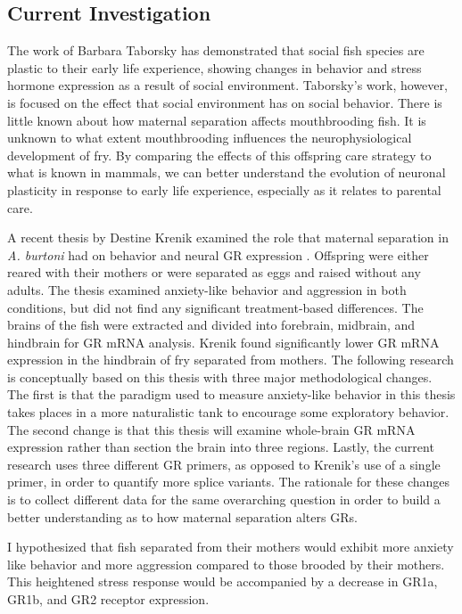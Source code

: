 \documentclass[12pt,twoside]{reedthesis}
\begin{document}
\subsection{Current Investigation}
 
The work of Barbara Taborsky has demonstrated that social fish species are
plastic to their early life experience, showing changes in behavior and stress
hormone expression as a result of social environment. Taborsky's work, however, is focused on the effect that social
environment has on social behavior. There is little known about how maternal
separation affects mouthbrooding fish. It is unknown to what extent
mouthbrooding influences the neurophysiological development of fry. By comparing
the effects of this offspring care strategy to what is known in mammals, we can
better understand the evolution of neuronal plasticity in response to early life
experience, especially as it relates to parental care. 

A recent thesis by Destine Krenik examined the role that maternal separation in
\textit{A. burtoni} had on behavior and neural GR
expression \citep{KrenikDestine2018Teom}. Offspring were either reared with their mothers or were separated as
eggs and raised without any adults. The thesis examined anxiety-like behavior and aggression in both
conditions, but did not find any significant treatment-based differences. The
brains of the fish were extracted and divided into forebrain, midbrain, and hindbrain for
GR mRNA analysis. Krenik found significantly lower GR mRNA expression in
the hindbrain of fry separated from mothers. The following research is
conceptually based on this thesis with three major methodological changes. The
first is that the paradigm used to measure anxiety-like behavior in this thesis takes places in
a more naturalistic tank to encourage some exploratory behavior. The second change is that this thesis will examine
whole-brain GR mRNA expression rather than section the brain into three regions.
Lastly,
the current research uses three different GR primers, as opposed to Krenik's use
of a single primer, in order to quantify
more splice variants. The rationale for these changes is to collect different
data for the same overarching question in order to build a better understanding
as to how
maternal separation alters GRs.

I hypothesized that fish separated from their mothers would exhibit more anxiety
like behavior and more aggression compared to those brooded by their mothers.
This heightened stress response would be accompanied by a decrease in GR1a,
GR1b, and GR2 receptor expression.
\end{document}
